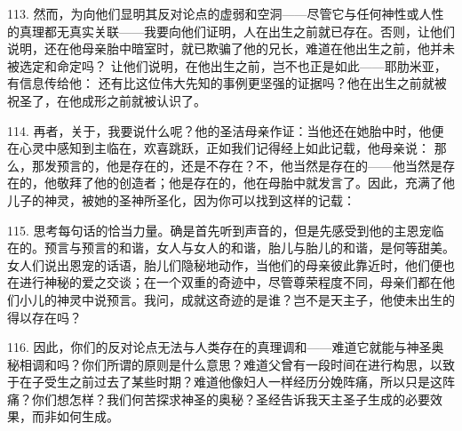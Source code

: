 113. 然而，为向他们显明其反对论点的虚弱和空洞——尽管它与任何神性或人性的真理都无真实关联——我要向他们证明，人在出生之前就已存在。否则，让他们说明，还在他母亲胎中暗室时，就已欺骗了他的兄长，难道在他出生之前，他并未被选定和命定吗？ 让他们说明，在他出生之前，岂不也正是如此——耶肋米亚，有信息传给他： 还有比这位伟大先知的事例更坚强的证据吗？他在出生之前就被祝圣了，在他成形之前就被认识了。\par

114. 再者，关于，我要说什么呢？他的圣洁母亲作证：当他还在她胎中时，他便在心灵中感知到主临在，欢喜跳跃，正如我们记得经上如此记载，他母亲说： 那么，那发预言的，他是存在的，还是不存在？不，他当然是存在的——他当然是存在的，他敬拜了他的创造者；他是存在的，他在母胎中就发言了。因此，充满了他儿子的神灵，被她的圣神所圣化，因为你可以找到这样的记载：\par

115. 思考每句话的恰当力量。确是首先听到声音的，但是先感受到他的主恩宠临在的。预言与预言的和谐，女人与女人的和谐，胎儿与胎儿的和谐，是何等甜美。女人们说出恩宠的话语，胎儿们隐秘地动作，当他们的母亲彼此靠近时，他们便也在进行神秘的爱之交谈；在一个双重的奇迹中，尽管尊荣程度不同，母亲们都在他们小儿的神灵中说预言。我问，成就这奇迹的是谁？岂不是天主子，他使未出生的得以存在吗？\par

116. 因此，你们的反对论点无法与人类存在的真理调和——难道它就能与神圣奥秘相调和吗？你们所谓的原则是什么意思？难道父曾有一段时间在进行构思，以致于在子受生之前过去了某些时期？难道他像妇人一样经历分娩阵痛，所以只是这阵痛？你们想怎样？我们何苦探求神圣的奥秘？圣经告诉我天主圣子生成的必要效果，而非如何生成。\par

\par

